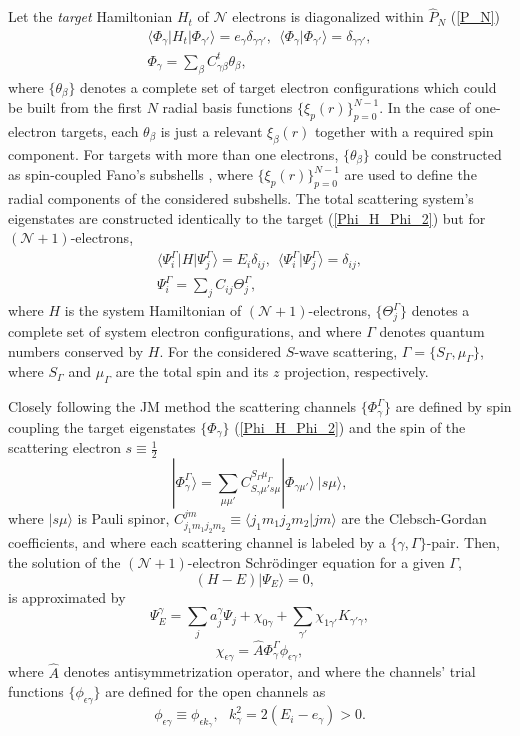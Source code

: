 \documentclass[aip
, pra
, showpacs
, aps
, twocolumn
, groupedaddress
, floatfix
]{revtex4}
\newcommand{\beq}{\begin{equation}}
\newcommand{\eeq}{\end{equation}}
\newcommand{\barr}{\begin{array}}
\newcommand{\earr}{\end{array}}
\begin{document}
Let the {\em target} Hamiltonian $H_t$ of
$\mathcal{N}$ electrons
is diagonalized within $\hat{P}_N$ (\ref{P_N})
\beq \barr{l}
\langle \Phi_\gamma|H_t|\Phi_{\gamma'}\rangle=e_\gamma \delta_{\gamma\gamma'}, \ \
\langle \Phi_\gamma|\Phi_{\gamma'}\rangle=\delta_{\gamma\gamma'},\\
\Phi_\gamma = \sum_{\beta} C^t_{\gamma \beta} \theta_\beta,
\earr \label{Phi_H_Phi_2} \eeq
where $\{\theta_\beta\}$ denotes a complete set of target electron configurations which could be built from
the first $N$ radial basis functions $\{\xi_p(r)\}_{p=0}^{N-1}$.
In the case of one-electron targets, each
$\theta_\beta$ is just a relevant $\xi_\beta(r)$ together with a required spin component.
For targets with more than one electrons, $\{\theta_\beta\}$ could be constructed as spin-coupled Fano's subshells \cite{Fano65,KFB11},
where $\{\xi_p(r)\}_{p=0}^{N-1}$ are used to define the radial components of the considered subshells.
The total scattering system's eigenstates are constructed identically to the target (\ref{Phi_H_Phi_2})
but for $(\mathcal{N}+1)$-electrons,
\beq \barr{l}
\langle\Psi_i^\Gamma|H|\Psi_j^\Gamma\rangle=E_i\delta_{ij}, \ \
 \langle\Psi_i^\Gamma|\Psi_j^\Gamma\rangle=\delta_{ij},\\
\Psi^\Gamma_i = \sum_{j} C_{ij} \Theta^\Gamma_j,
\earr \label{Psi_H_Psi_2} \eeq
where $H$ is the system Hamiltonian of $(\mathcal{N}+1)$-electrons, $\{\Theta_j^\Gamma\}$
denotes a complete set of system electron configurations, and where
$\Gamma$ denotes quantum numbers conserved by $H$.
For the considered $S$-wave scattering,
$\Gamma=\{S_\Gamma,\mu_\Gamma\}$, where $S_\Gamma$ and $\mu_\Gamma$ are the total spin and its $z$ projection, respectively.


Closely following the JM method \cite{BR76p1491, KFB11} the scattering channels $\{\Phi_\gamma^\Gamma\}$ are defined by spin coupling the target eigenstates
$\{\Phi_\gamma\}$ (\ref{Phi_H_Phi_2})
and the spin of the scattering electron
$s\equiv \frac{1}{2}$
\beq
| \Phi_{\gamma}^{\Gamma} \rangle = \sum_{\mu \mu'}
C_{S_\gamma \mu' s \mu}^{S_\Gamma \mu_\Gamma}
|\Phi_{\gamma \mu'} \rangle \ |s \mu  \rangle,
\label{chi_phi_Gamma} \eeq
where $|s \mu \rangle$ is Pauli spinor,
$C_{j_1m_1j_2m_2}^{jm} \equiv \langle j_1m_1 j_2 m_2| jm\rangle$ are the Clebsch-Gordan coefficients,
and where each scattering channel is labeled by a $\{\gamma, \Gamma\}$-pair.
Then, the solution of the $(\mathcal{N}+1)$-electron Schr\"odinger equation for a given $\Gamma$,
\beq
(H-E) | \Psi_E \rangle =0,  \ \ \  \label{H_E_Psi_E_2}
\eeq
is approximated by
\beq
 \Psi_{E}^\gamma  =  \sum_j a_j^\gamma \Psi_j + \chi_{0 \gamma}
+ \sum_{\gamma'}  \chi_{1 \gamma'} K_{\gamma' \gamma}
 ,
\eeq
\beq
\chi_{\epsilon \gamma} = \hat{A} \Phi^\Gamma_{\gamma}  \phi_{\epsilon \gamma},
\eeq
where $\hat{A}$ denotes antisymmetrization operator,
and where the channels' trial functions $\{ \phi_{\epsilon \gamma} \}$ are defined for the open channels as
\beq
\phi_{\epsilon \gamma}\equiv \phi_{\epsilon k_\gamma}, \ \ \   k_{\gamma}^2 = 2(E_i - e_\gamma) > 0.
\eeq
\end{document}
